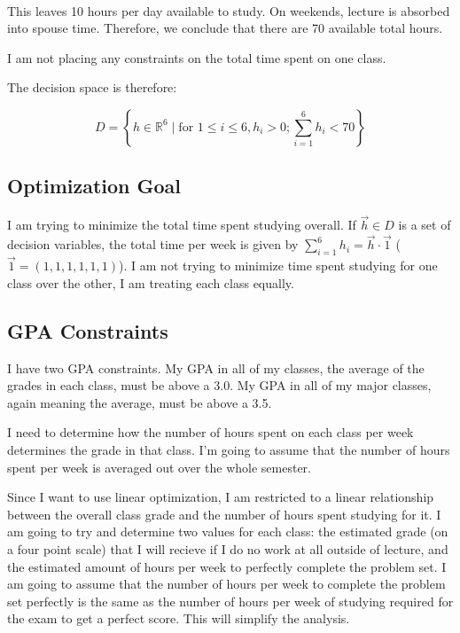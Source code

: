 \documentclass{article}
\begin{document}
\paragraph{}
This leaves 10 hours per day available to study.
On weekends, lecture is absorbed into spouse time.
Therefore, we conclude that there are 70 available total hours.

I am not placing any constraints on the total time spent on one class.

The decision space is therefore:

\[ D = \left\{ h \in \mathbb{R}^6 \mid \text{for } 1 \leq i \leq 6, h_i > 0; 
	\sum_{i=1}^6 h_i < 70 \right\} \]

\subsection{Optimization Goal}
I am trying to minimize the total time spent studying
	overall.
If $\vec{h} \in D$ is a set of decision variables, the total time per week
	is given by $\sum_{i=1}^6 h_i = \vec{h} \cdot \vec{1}$ ($\vec{1} = (1,1,1,1,1,1)$).
I am not trying to minimize time spent studying for one class over the other,
	I am treating each class equally.

\subsection{GPA Constraints}

I have two GPA constraints.
My GPA in all of my classes, the average of the grades in each class,
	must be above a 3.0.
My GPA in all of my major classes, again meaning the average, must be
	above a 3.5.

I need to determine how the number of hours spent on each class per week
	determines the grade in that class.
I'm going to assume that the number of hours spent per week is averaged out
	over the whole semester.

Since I want to use linear optimization, I am restricted to a linear relationship
	between the overall class grade and the number of hours spent studying
	for it.
I am going to try and determine two values for each class:
	the estimated grade (on a four point scale) that I will recieve if I do no work at all
		outside of lecture,
	and the estimated amount of hours per week to perfectly complete the problem set.
I am going to assume that the number of hours per week to complete the problem set
	perfectly is the same as the number of hours per week of studying required for
	the exam to get a perfect score.
This will simplify the analysis.
\end{document}
